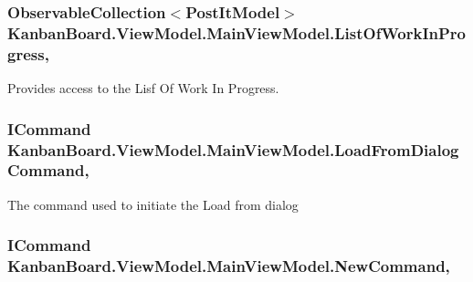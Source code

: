 \subsubsection[{List\+Of\+Work\+In\+Progress}]{\setlength{\rightskip}{0pt plus 5cm}Observable\+Collection$<${\bf Post\+It\+Model}$>$ Kanban\+Board.\+View\+Model.\+Main\+View\+Model.\+List\+Of\+Work\+In\+Progress\hspace{0.3cm}{\ttfamily [get]}, {\ttfamily [set]}}\label{class_kanban_board_1_1_view_model_1_1_main_view_model_ac28a6f8225d24e60ea7f1196cbf8d6a3}


Provides access to the Lisf Of Work In Progress. 

\hypertarget{class_kanban_board_1_1_view_model_1_1_main_view_model_ac78c41a4e5c852c2afdd853439def3b0}{}
\subsubsection[{Load\+From\+Dialog\+Command}]{\setlength{\rightskip}{0pt plus 5cm}I\+Command Kanban\+Board.\+View\+Model.\+Main\+View\+Model.\+Load\+From\+Dialog\+Command\hspace{0.3cm}{\ttfamily [get]}, {\ttfamily [set]}}\label{class_kanban_board_1_1_view_model_1_1_main_view_model_ac78c41a4e5c852c2afdd853439def3b0}


The command used to initiate the Load from dialog 

\hypertarget{class_kanban_board_1_1_view_model_1_1_main_view_model_ac8874b3c893afb269198991fb7780d3e}{}
\subsubsection[{New\+Command}]{\setlength{\rightskip}{0pt plus 5cm}I\+Command Kanban\+Board.\+View\+Model.\+Main\+View\+Model.\+New\+Command\hspace{0.3cm}{\ttfamily [get]}, {\ttfamily [set]}}\label{class_kanban_board_1_1_view_model_1_1_main_view_model_ac8874b3c893afb269198991fb7780d3e}


